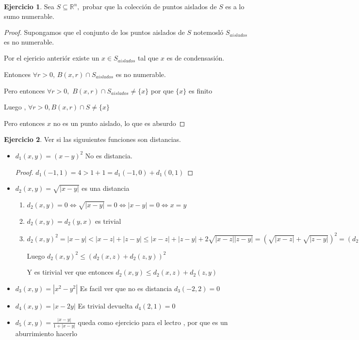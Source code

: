 \documentclass[12pt]{article}
\newcommand{\R}{\mathbb{R}}
\theoremstyle{definition}
\newtheorem{ej}{Ejercicio}
\begin{document}
\begin{ej}
  Sea $S \subseteq \R^n,$ probar que la colección de puntos aislados de $S$ es a lo sumo numerable.

  \begin{proof}
    Supongamos que el conjunto de los puntos aislados de $S$ notemosló $S_{aislados}$ es no numerable. 

    Por el ejericio anteriór existe un $x \in S_{aislados}$ tal que $x$ es de condensasión.

    Entonces $\forall r > 0$, $B(x,r) \cap S_{aislados}$ es no numerable.

    Pero entonces $\forall r>0,$ $B(x,r) \cap S_{aislados} \neq \{x\} $ por que $\{x\}$ es finito

    Luego , $\forall r>0, B(x,r)  \cap S \neq \{x\}$

    Pero entonces $x$ no es un punto aislado, lo que es absurdo
  \end{proof}
\end{ej}
\newpage
\begin{ej} Ver si las siguuientes funciones son distancias.
  \begin{itemize}
    \item $d_{1}(x,y) = (x - y)^2$ No es distancia.
      \begin{proof}
	$d_{1}(-1,1) = 4 > 1 + 1 = d_{1}(-1,0) + d_{1}(0,1)$
      \end{proof}
    \item $d_{2}(x,y) = \sqrt{| x - y|}$ es una distancia
      \begin{enumerate}
	\item $d_{2}(x,y) = 0 \iff \sqrt{| x - y |} = 0 \iff |x-y| = 0 \iff x=y$
	\item $d_{2}(x,y) = d_{2}(y,x)$ es trivial
	\item $d_{2}(x,y)^2 = |x-y| < |x-z| + |z - y| \leq |x - z| + |z - y | + 2\sqrt{|x-z||z-y|} = (\sqrt{|x-z|}+ \sqrt{|z - y|})^2 = (d_{2}(x,z) + d_{2}(z,y))^2$ 
      
	  Luego $d_{2}(x,y)^2 \leq (d_{2}(x,z) + d_{2}(z,y))^2$

	  Y es tirivial ver que entonces $d_{2}(x,y) \leq d_{2}(x,z) + d_{2}(z,y)$
      \end{enumerate}
    \item $d_{3}(x,y) = |x^2 - y^2|$ Es facil ver que no es distancia $d_{3}(-2,2) = 0$
    \item $d_{4}(x,y) = |x -2y|$ Es trivial devuelta $d_{4}(2,1) = 0$
    \item $d_{5}(x,y) = \frac{|x-y|}{1 + |x-y|}$ queda como ejercicio para el lectro , por que es un aburrimiento hacerlo
\end{itemize}
\end{ej}
\end{document}
